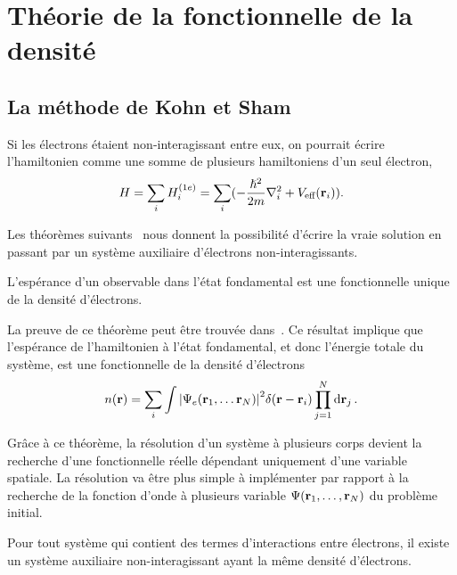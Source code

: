 \section{Théorie de la fonctionnelle de la densité}
\subsection{La méthode de Kohn et Sham}
\label{subsec-KS}
Si les électrons étaient non-interagissant entre eux,
on pourrait écrire l'hamiltonien comme une somme de plusieurs hamiltoniens d'un seul électron, \ie{}
\begin{equation}\label{eqn-H-1e}
  H = \sum_i H_i^{(1e)} = \sum_i (-\frac{\hslash^2}{2m}\laplacian_i + V_{\V{eff}}(\vb{r}_i)).
\end{equation}

Les théorèmes suivants~\cite{Hohenberg1964, Kohn1965} nous donnent la possibilité d'écrire
la vraie solution en passant par un système auxiliaire d'électrons non-interagissants.

\begin{theoreme}
  L'espérance d'un observable dans l'état fondamental est une fonctionnelle unique
  de la densité d'électrons.
\end{theoreme}

La preuve de ce théorème peut être trouvée dans~\cite{Martin2004, Sottile2003}.
Ce résultat implique que l'espérance de l'hamiltonien à l'état fondamental,
et donc l'énergie totale du système, est une fonctionnelle de la densité d'électrons
\begin{equation*}
n(\vb{r}) = \sum_i \int \abs{\Psi_e(\vb{r}_1, \ldots \vb{r}_N)}^2 \delta(\vb{r} - \vb{r}_i) \prod_{j=1}^N \dd{\vb{r}_j}.
\end{equation*}

Grâce à ce théorème, la résolution d'un système à plusieurs corps devient
la recherche d'une fonctionnelle réelle dépendant uniquement d'une variable spatiale.
La résolution va être plus simple à implémenter par rapport à la recherche de la fonction d'onde
à plusieurs variable $\Psi (\vb{r}_1, \ldots, \vb{r}_N)$ du problème initial.

\begin{theoreme}
\label{thm-ks}
  Pour tout système qui contient des termes d'interactions entre électrons,
  il existe un système auxiliaire non-interagissant ayant la même densité d'électrons.
\end{theoreme}

